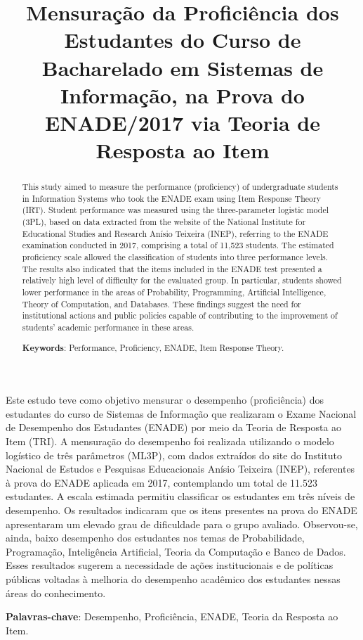 \documentclass[12pt]{article}
\title{Mensuração da Proficiência dos Estudantes do Curso de Bacharelado em Sistemas de Informação, na Prova do ENADE/2017 via Teoria de Resposta ao Item}
\begin{document}
 
\maketitle

\begin{abstract}
This study aimed to measure the performance (proficiency) of undergraduate students in Information Systems who took the ENADE exam using Item Response Theory (IRT). Student performance was measured using the three-parameter logistic model (3PL), based on data extracted from the website of the National Institute for Educational Studies and Research Anísio Teixeira (INEP), referring to the ENADE examination conducted in 2017, comprising a total of 11,523 students. The estimated proficiency scale allowed the classification of students into three performance levels. The results also indicated that the items included in the ENADE test presented a relatively high level of difficulty for the evaluated group. In particular, students showed lower performance in the areas of Probability, Programming, Artificial Intelligence, Theory of Computation, and Databases. These findings suggest the need for institutional actions and public policies capable of contributing to the improvement of students' academic performance in these areas.
  
\noindent
\textbf{Keywords}: Performance, Proficiency, ENADE, Item Response Theory.
\end{abstract}

\begin{resumo}
Este estudo teve como objetivo mensurar o desempenho (proficiência) dos estudantes do curso de Sistemas de Informação que realizaram o Exame Nacional de Desempenho dos Estudantes (ENADE) por meio da Teoria de Resposta ao Item (TRI). A mensuração do desempenho foi realizada utilizando o modelo logístico de três parâmetros (ML3P), com dados extraídos do site do Instituto Nacional de Estudos e Pesquisas Educacionais Anísio Teixeira (INEP), referentes à prova do ENADE aplicada em 2017, contemplando um total de 11.523 estudantes. A escala estimada permitiu classificar os estudantes em três níveis de desempenho. Os resultados indicaram que os itens presentes na prova do ENADE apresentaram um elevado grau de dificuldade para o grupo avaliado. Observou-se, ainda, baixo desempenho dos estudantes nos temas de Probabilidade, Programação, Inteligência Artificial, Teoria da Computação e Banco de Dados. Esses resultados sugerem a necessidade de ações institucionais e de políticas públicas voltadas à melhoria do desempenho acadêmico dos estudantes nessas áreas do conhecimento.

\noindent
\textbf{Palavras-chave}: Desempenho, Proficiência, ENADE, Teoria da Resposta ao Item.
\end{resumo}
\end{document}
